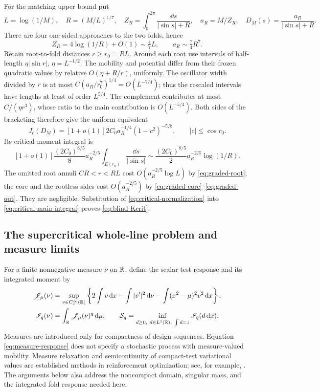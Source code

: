 For the matching upper bound put
\[
 L=\log(1/M),\quad R=(M/L)^{1/7},\quad
 Z_R=\int_0^{2\pi}\frac{\dd s}{|\sin s|+R},\quad
 a_R=M/Z_R,\quad D_M(s)=\frac{a_R}{|\sin s|+R}.
\]
There are four one-sided approaches to the two folds, hence
\begin{equation}\label{eq:critical-normalization}
 Z_R=4\log(1/R)+O(1)\sim\tfrac47 L,
 \qquad a_R\sim\tfrac74R^7.
\end{equation}
Retain root-to-fold distances $r\ge r_0=RL$. Around each root use
intervals of half-length $\eta|\sin r|$, $\eta=L^{-1/2}$.
The mobility and potential differ from their frozen quadratic values
by relative $O(\eta+R/r)$, uniformly. The oscillator width divided
by $r$ is at most $C(a_R/r_0^7)^{1/4}=O(L^{-7/4})$; thus the
rescaled intervals have lengths at least of order $L^{5/4}$.
The complement contributes at most $C/(\eta r^3)$, whose ratio to
the main contribution is $O(L^{-5/4})$. Both sides of the bracketing
therefore give the uniform equivalent
\[
 J_c(D_M)=[1+o(1)]2C_0a_R^{-1/4}(1-c^2)^{-5/8},
       \qquad |c|\le\cos r_0.
\]
Its critical moment integral is
\begin{equation}\label{eq:critical-main-integral}
 [1+o(1)]\frac{(2C_0)^{8/5}}8a_R^{-2/5}
           \int_{E(r_0)}\frac{\dd s}{|\sin s|}
 \sim\frac{(2C_0)^{8/5}}2a_R^{-2/5}\log(1/R).
\end{equation}
The omitted root annuli $CR<r<RL$ cost
$O(a_R^{-2/5}\log L)$ by \eqref{eq:graded-root}; the core and the
rootless sides cost $O(a_R^{-2/5})$ by
\eqref{eq:graded-core}--\eqref{eq:graded-out}. They are negligible.
Substitution of \eqref{eq:critical-normalization} into
\eqref{eq:critical-main-integral} proves \eqref{eq:blind-Kcrit}.

\subsection{The supercritical whole-line problem and measure limits}
For a finite nonnegative measure $\nu$ on $\mathbb R$, define the scalar test
response and its integrated moment by
\begin{align}
 \mathscr J_\mu(\nu)&=\sup_{v\in C_c^\infty(\mathbb R)}
 \left\{2\int v\,\mathrm d x-\int|v'|^2\,\mathrm d\nu
                   -\int(x^2-\mu)^2v^2\,\mathrm d x\right\},
                                          \label{eq:measure-response}\\
 \mathscr I_q(\nu)&=\int_\mathbb R\mathscr J_\mu(\nu)^q\,\mathrm d\mu,\qquad
 \mathcal S_q=\inf_{d\ge0,\ d\in L^1(\mathbb R),\ \int d=1}
                         \mathscr I_q(d\,\mathrm d x).
                                          \label{eq:Sq}
\end{align}
Measures are introduced only for compactness of design sequences.
Equation \eqref{eq:measure-response} does not specify a stochastic
process with measure-valued mobility. Measure relaxation and
semicontinuity of compact-test variational values are established
methods in reinforcement optimization; see, for example,
\citet[Proposition~4.1]{ButtazzoOudetVelichkov2015}. The arguments below
also address the noncompact domain, singular mass, and the integrated
fold response needed here.

